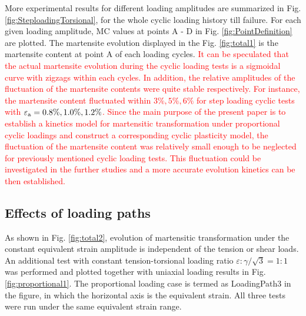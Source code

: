 \documentclass[preprint,5p,twocolumn,10pt,sort&compress]{elsarticle}
\newcommand{\marked}[1]{\textcolor{red}{#1}}
\begin{document}
More experimental results for different loading amplitudes are summarized in Fig. \ref{fig:SteploadingTorsional}, for the whole cyclic loading history till failure. For each given loading amplitude, MC values at points A - D in Fig. \ref{fig:PointDefinition} are plotted. The martensite evolution displayed in the Fig. \ref{fig:total1} is the martensite content at point A of each loading cycles. \marked{It can be speculated that the actual martensite evolution during the cyclic loading tests is a sigmoidal curve with zigzags within each cycles. In addition, the relative amplitudes of the fluctuation of the martensite contents were quite stable respectively. For instance, the martensite content fluctuated within $3\%,5\%,6\%$ for step loading cyclic tests with $\varepsilon_{\rm a}=0.8\%,1.0\%,1.2\%$. Since the main purpose of the present paper is to establish a kinetics model for martensitic transformation under proportional cyclic loadings and construct a corresponding cyclic plasticity model, the fluctuation of the martensite content was relatively small enough to be neglected for previously mentioned cyclic loading tests. This fluctuation could be investigated in the further studies and a more accurate evolution kinetics can be then established.}


\subsection{Effects of loading paths}
As shown in Fig. \ref{fig:total2}, evolution of martensitic transformation under the constant equivalent strain amplitude is independent of the tension or shear loads. An additional test with constant tension-torsional loading ratio $\varepsilon : \gamma /\sqrt{3}=1:1$ was performed and plotted together with uniaxial loading results in Fig.  \ref{fig:proportional1}. The proportional loading case is termed as LoadingPath3 in the figure, in which the horizontal axis is the equivalent strain. All three tests were run under the same equivalent strain range.
\end{document}
